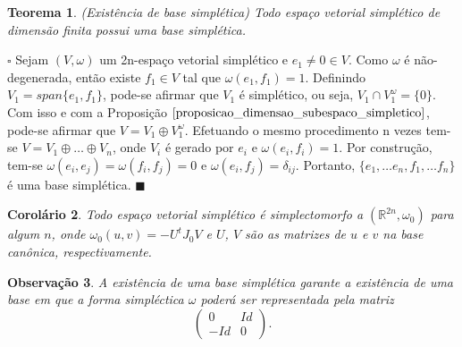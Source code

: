 \documentclass[12pt]{book}
\newtheorem{teorema}{Teorema}[section]
\newtheorem{corolario}[teorema]{Corolário}
\newtheorem{observacao}[teorema]{Observação}
\newenvironment{prova}[1]{$\square$ #1}{\hfill$\blacksquare$}
\newcommand{\estruturacomplexa}{J_{0}}
\newcommand{\formaSimpleticaPadrao}[2]{\omega_{0}(#1, #2)}
\newcommand{\real}[1]{\mathbb{R}^{#1}}
\begin{document}
	\begin{teorema}\label{teorema_existencia_base_simpletica}
		(Existência de base simplética) Todo espaço vetorial simplético de dimensão finita possui uma base simplética.
	\end{teorema}
	\begin{prova}
		Sejam $(V, \omega)$ um 2n-espaço vetorial simplético e $e_{1} \neq 0\in V$. Como $\omega$ é não-degenerada, então existe $f_{1} \in V$ tal que $\omega(e_{1}, f_{1}) = 1$. Definindo $V_{1} = span\{e_{1}, f_{1}\}$, pode-se afirmar que $V_{1}$ é simplético, ou seja, $V_{1}\cap V_{1}^{\omega} = \{0\}$. Com isso e com a Proposição $\ref{proposicao_dimensao_subespaco_simpletico}$, pode-se afirmar que $V = V_{1}\oplus V_{1}^{\omega}$. Efetuando o mesmo procedimento n vezes tem-se $V = V_{1}\oplus \dots \oplus V_{n}$, onde $V_{i}$ é gerado por $e_{i}$ e $\omega(e_{i}, f_{i}) = 1$. Por construção, tem-se $\omega(e_{i}, e_{j})=\omega(f_{i}, f_{j}) =0$ e $\omega(e_{i}, f_{j}) = \delta_{ij}$. Portanto, $\{e_{1}, \dots e_{n}, f_{1}, \dots f_{n}\}$ é uma base simplética.
	\end{prova}
	
	\begin{corolario}
		
		Todo espaço vetorial simplético é simplectomorfo a $(\real{2n}, \omega_{0})$ para algum $n$, onde $\formaSimpleticaPadrao{u}{v}=-U^t\estruturacomplexa V$ e $U$, $V$ são as matrizes de $u$ e $v$ na base canônica, respectivamente.
	\end{corolario}
	
	\begin{observacao}\label{observacao_existencia_base_simpletica}
		A existência de uma base simplética garante a existência de uma base em que a forma simpléctica $\omega$ poderá ser representada pela matriz
		$$
		\left(
		\begin{array}{cc}
		0 & Id
		\\
		-Id & 0
		\end{array}
		\right).
		$$
	\end{observacao}
	
\end{document}

